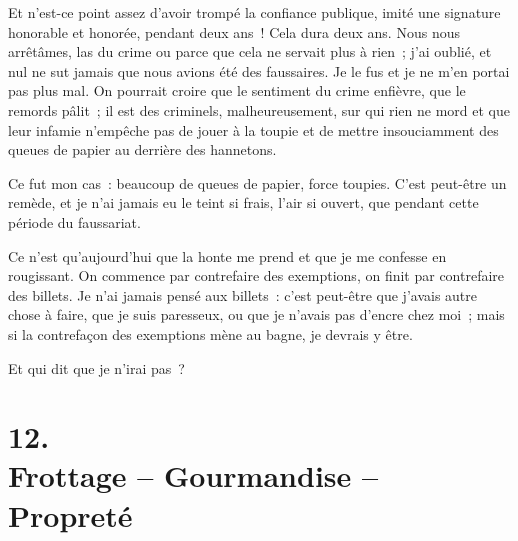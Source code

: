 \documentclass[french,twoside]{book} %
\begin{document}
Et n’est-ce point assez d’avoir trompé la confiance publique, imité une signature honorable et honorée, pendant deux ans ! Cela dura deux ans. Nous nous arrêtâmes, las du crime ou parce que cela ne servait plus à rien ; j’ai oublié, et nul ne sut jamais que nous avions été des faussaires. Je le fus et je ne m’en portai pas plus mal. On pourrait croire que le sentiment du crime enfièvre, que le remords pâlit ; il est des criminels, malheureusement, sur qui rien ne mord et que leur infamie n’empêche pas de jouer à la toupie et de mettre insouciamment des queues de papier au derrière des hannetons.\par
\bigbreak
\noindent Ce fut mon cas : beaucoup de queues de papier, force toupies. C’est peut-être un remède, et je n’ai jamais eu le teint si frais, l’air si ouvert, que pendant cette période du faussariat.\par
Ce n’est qu’aujourd’hui que la honte me prend et que je me confesse en rougissant. On commence par contrefaire des exemptions, on finit par contrefaire des billets. Je n’ai jamais pensé aux billets : c’est peut-être que j’avais autre chose à faire, que je suis paresseux, ou que je n’avais pas d’encre chez moi ; mais si la contrefaçon des exemptions mène au bagne, je devrais y être.\par
\bigbreak
\noindent Et qui dit que je n’irai pas ?
\section[{12. Frottage – Gourmandise – Propreté}]{12. \\
Frottage – Gourmandise – Propreté}\renewcommand{\leftmark}{12. \\
Frottage – Gourmandise – Propreté}
\end{document}
